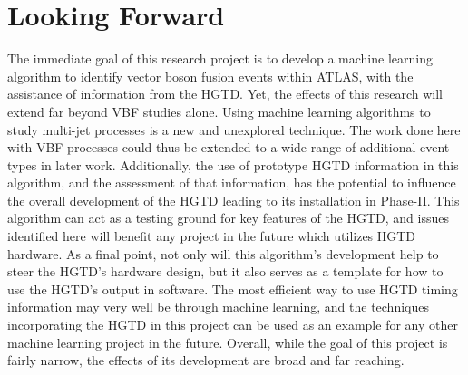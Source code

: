 \documentclass[12pt,letterpaper]{article}
\begin{document}
\section*{Looking Forward}
    The immediate goal of this research project is to develop a machine learning algorithm to identify vector boson fusion events within ATLAS, with the assistance of information from the HGTD. Yet, the effects of this research will extend far beyond VBF studies alone. Using machine learning algorithms to study multi-jet processes is a new and unexplored technique. The work done here with VBF processes could thus be extended to a wide range of additional event types in later work. Additionally, the use of prototype HGTD information in this algorithm, and the assessment of that information, has the potential to influence the overall development of the HGTD leading to its installation in Phase-II. This algorithm can act as a testing ground for key features of the HGTD, and issues identified here will benefit any project in the future which utilizes HGTD hardware. As a final point, not only will this algorithm's development help to steer the HGTD's hardware design, but it also serves as a template for how to use the HGTD's output in software. The most efficient way to use HGTD timing information may very well be through machine learning, and the techniques incorporating the HGTD in this project can be used as an example for any other machine learning project in the future. Overall, while the goal of this project is fairly narrow, the effects of its development are broad and far reaching.




\newpage
\begin{appendix}
\end{appendix}





\end{document}
